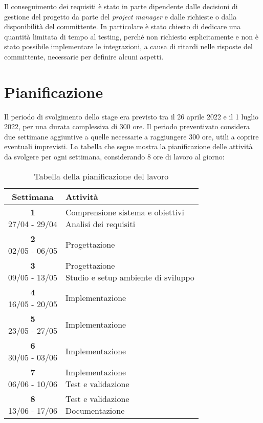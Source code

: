 \noindent Il conseguimento dei requisiti è stato in parte dipendente dalle decisioni di gestione del progetto da parte del \emph{project manager} e dalle richieste o dalla disponibilità del committente. In particolare è stato chiesto di dedicare una quantità limitata di tempo al testing, perché non richiesto esplicitamente e non è stato possibile implementare le integrazioni, a causa di ritardi nelle risposte del committente, necessarie per definire alcuni aspetti.


\section{Pianificazione}
Il periodo di svolgimento dello stage era previsto tra il 26 aprile 2022 e il 1 luglio 2022, per una durata complessiva di 300 ore. Il periodo preventivato considera due settimane aggiuntive a quelle necessarie a raggiungere 300 ore, utili a coprire eventuali imprevisti. La tabella che segue mostra la pianificazione delle attività da svolgere per ogni settimana, considerando 8 ore di lavoro al giorno:

\begin{table}[h]
	\centering
	\label{tab:pianificazione}
	\begin{tabularx}{0.65 \textwidth}{c|X}
		\rowcolor{white}
		\textbf{Settimana} & \textbf{Attività} \\
		\hline
		\makecell{\textbf{1} \\ 27/04 - 29/04} & \makecell[l]{Comprensione sistema e obiettivi \\ Analisi dei requisiti} \\
		\makecell{\textbf{2} \\ 02/05 - 06/05} & Progettazione \\
		\makecell{\textbf{3} \\ 09/05 - 13/05} & \makecell[l]{Progettazione \\ Studio e setup ambiente di sviluppo} \\
		\makecell{\textbf{4} \\ 16/05 - 20/05} & Implementazione \\
		\makecell{\textbf{5} \\ 23/05 - 27/05} & Implementazione \\
		\makecell{\textbf{6} \\ 30/05 - 03/06} & Implementazione \\
		\makecell{\textbf{7} \\ 06/06 - 10/06} & \makecell[l]{Implementazione \\ Test e validazione} \\
		\makecell{\textbf{8} \\ 13/06 - 17/06} & \makecell[l]{Test e validazione \\ Documentazione}
	\end{tabularx}
	\vspace{5pt}
	\caption{Tabella della pianificazione del lavoro}
\end{table}


